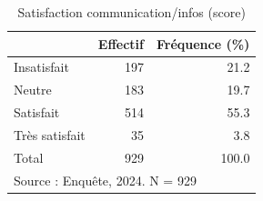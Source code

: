 \begin{table}[htbp]\centering
\def\sym#1{\ifmmode^{#1}\else\(^{#1}\)\fi}
\caption{Satisfaction communication/infos (score)}
\begin{tabular}{l*{2}{r}}
\toprule
            &    Effectif&Fréquence (\%)\\
\midrule
Insatisfait &         197&        21.2\\
Neutre      &         183&        19.7\\
Satisfait   &         514&        55.3\\
Très satisfait&          35&         3.8\\
Total       &         929&       100.0\\
\bottomrule
\multicolumn{3}{l}{\footnotesize Source : Enquête, 2024. N = 929}\\
\end{tabular}
\end{table}
